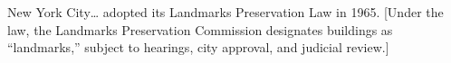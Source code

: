 New York City\ldots
adopted its Landmarks Preservation Law in 1965. [Under the law, the Landmarks
Preservation Commission designates buildings as ``landmarks,'' subject to
hearings, city approval, and judicial review.]
%
